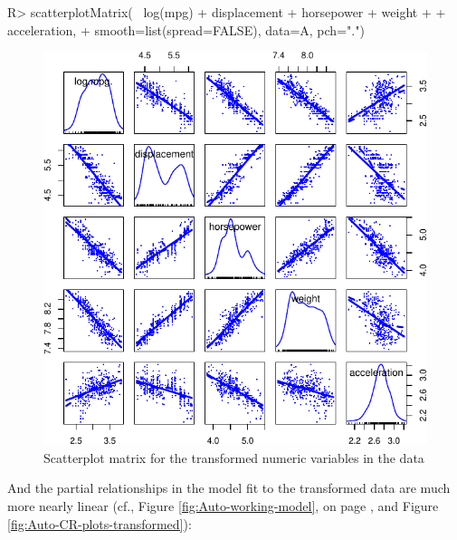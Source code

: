 \documentclass[
]{jss}
\begin{document}
\begin{CodeChunk}
\begin{CodeInput}
R> scatterplotMatrix(~ log(mpg) + displacement + horsepower + weight 
+                   + acceleration, 
+                   smooth=list(spread=FALSE), data=A, pch=".")
\end{CodeInput}
\begin{figure}

{\centering \includegraphics[width=0.6\linewidth]{JSS-article-3_files/figure-latex/Auto-transformed-scatterplot-matrix-1} 

}

\caption[Scatterplot matrix for the transformed numeric variables in the  data]{Scatterplot matrix for the transformed numeric variables in the  data}\label{fig:Auto-transformed-scatterplot-matrix}
\end{figure}
\end{CodeChunk}

And the partial relationships in the model fit to the transformed data
are much more nearly linear (cf., Figure \ref{fig:Auto-working-model},
on page \pageref{fig:Auto-working-model}, and Figure
\ref{fig:Auto-CR-plots-transformed}):
\end{document}
